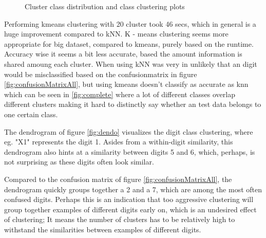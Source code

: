 \documentclass[10pt,a4paper]{article}
\begin{document}
\begin{figure}[H]
  		 \hspace{1em}
\caption{Cluster class distribution and class clustering plots}
\end{figure}


Performing kmeans clustering with 20 cluster took 46 secs, which in general is a huge
improvement compared to kNN. K - means clustering seems more appropriate for big dataset, 
compared to kmeans, purely based on the runtime.   Accuracy wise it seems a bit less accurate,
based the amount information is shared amoung each cluster. 
When using kNN was very in unlikely that an digit would be misclassified based on the
confusionmatrix  in figure \ref{fig:confusionMatrixAll}, but using kmeans doesn't classify as
accurate as knn which can be seen in \ref{fig:complete} where a lot of different classes overlap
different clusters making it hard to distinctly say whether an test data belongs to
one certain class. 

The dendrogram of figure \ref{fig:dendo} visualizes
the digit class clustering, where eg. "X1" represents the digit 1.
Asides from a within-digit similarity, this dendrogram also
hints at a similarity between digits 5 and 6, which,
perhaps, is not surprising as these digits often look similar.

Compared to the confusion matrix of figure \ref{fig:confusionMatrixAll},
the dendrogram quickly groups together a 2 and a 7,
which are among the most often confused digits.
Perhaps this is an indication that too aggressive clustering
will group together examples of different digits
early on, which is an undesired effect of clustering;
It means the number of clusters has to be relatively high
to withstand the similarities between examples of different digits.
\end{document}
